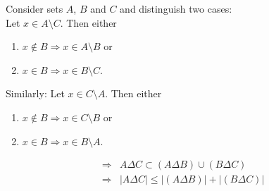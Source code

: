 \documentclass[10pt,a4paper,boxed]{hmcpset}
\begin{document}
\begin{solution}
\begin{enumerate}[(i)]
\begin{description}
							Consider sets $A$, $B$ and $C$ and distinguish two cases:\\
							Let $x\in A \setminus C$. Then either
							\begin{enumerate}
								\item $x \notin B \Rightarrow x \in A \setminus B$ or
								\item $x \in B \Rightarrow x \in B \setminus C$.
							\end{enumerate}
							Similarly: Let $x\in C \setminus A$. Then either
							\begin{enumerate}
								\item $x \notin B \Rightarrow x \in C \setminus B$ or
								\item $x \in B \Rightarrow x \in B \setminus A$.
							\end{enumerate}
							\begin{align*}
								\Rightarrow & A \Delta C \subset (A \Delta B) \cup (B \Delta C) \\
								\Rightarrow & \left\vert A \Delta C \right\vert \leq \left\vert (A \Delta B) \right\vert + \left\vert (B \Delta C) \right\vert
							\end{align*}
					\end{description}
			\end{enumerate}
		\end{solution}

	
\end{document}
